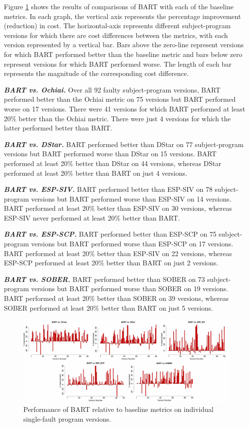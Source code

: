 Figure \ref{BART_VS_Base} shows the results of comparisons of BART with each of the baseline metrics.  In each graph, the vertical axis represents the percentage improvement (reduction) in cost. The horizontal-axis represents different subject-program versions for which there are cost differences between the metrics, with each version represented by a vertical bar.   Bars above the zero-line represent versions for which BART performed better than the baseline metric and bars below zero represent versions for which BART performed worse.  The length of each bar represents the magnitude of the corresponding cost difference.

\textit{\textbf{ BART vs. Ochiai.}}  Over all 92 faulty subject-program versions, BART performed better than the Ochiai metric on 75 versions but BART performed worse on 17 versions.  There were 41 versions for which BART performed at least 20\% better than the Ochiai metric.  There were just 4 versions for which the latter performed better than BART.

\textit{\textbf{ BART vs. DStar.}}  BART performed better than DStar on 77 subject-program versions but BART performed worse than DStar on 15 versions.  BART performed at least 20\% better than DStar on 44 versions, whereas DStar performed at least 20\% better than BART on just 4 versions.

\textit{\textbf{ BART vs. ESP-SIV.}} BART performed better than ESP-SIV on 78 subject-program versions but BART performed worse than ESP-SIV on 14 versions.  BART performed at least 20\% better than ESP-SIV on 30 versions, whereas ESP-SIV never performed at least 20\% better than BART.

\textit{\textbf{ BART vs. ESP-SCP.}}  BART performed better than ESP-SCP on 75 subject-program versions but BART performed worse than ESP-SCP on 17 versions.  BART performed at least 20\% better than ESP-SIV on 22 versions, whereas ESP-SCP performed at least 20\% better than BART on just 2 versions.

\textit{\textbf{ BART vs. SOBER.}}  BART performed better than SOBER on 73 subject-program versions but BART performed worse than SOBER on 19 versions.  BART performed at least 20\% better than SOBER on 39 versions, whereas SOBER performed at least 20\% better than BART on just 5 versions.

\begin{figure}
\centering
\includegraphics[width=\textwidth]{chapter4_BART_VS_Base.pdf}
\caption{Performance of BART relative to baseline metrics on individual single-fault program versions.}
\label{BART_VS_Base}
\end{figure}

